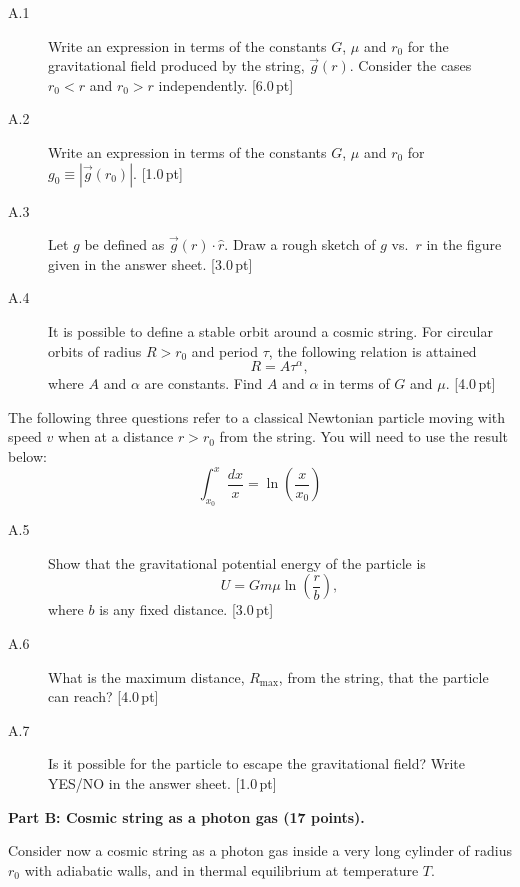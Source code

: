 \begin{description}
\item[A.1] Write an expression in terms of the constants $G$, $\mu$ and $r_0$
  for the gravitational field produced by the string, $\vec{g}(r)$. Consider
  the cases $r_0 < r$ and $r_0 > r$ independently. \hfill[6.0\,pt]
\item[A.2] Write an expression in terms of the constants $G$, $\mu$ and $r_0$
  for $g_0 \equiv |\vec{g}(r_0)|$. \hfill[1.0\,pt]
\item[A.3] Let $g$ be defined as $\vec{g}(r)\cdot\hat{r}$. Draw a rough sketch
  of $g$ vs.\ $r$ in the figure given in the answer sheet. \hfill[3.0\,pt]
\item[A.4] It is possible to define a stable orbit around a cosmic string. For
  circular orbits of radius $R > r_0$ and period $\tau$, the following
  relation is attained
  \[ R = A\tau^\alpha, \]
  where $A$ and $\alpha$ are constants. Find $A$ and $\alpha$ in terms of $G$
  and $\mu$. \hfill[4.0\,pt]
\end{description}

The following three questions refer to a classical Newtonian particle moving
with speed $v$ when at a distance $r > r_0$ from the string. You will need to
use the result below:
\[ \int_{x_0}^{x}\frac{dx}{x} = \ln\left(\frac{x}{x_0}\right) \]

\begin{description}
\item[A.5] Show that the gravitational potential energy of the particle is
  \[ U = Gm\mu\ln\left(\frac{r}{b}\right), \]
  where $b$ is any fixed distance. \hfill[3.0\,pt]
\item[A.6] What is the maximum distance, $R_{\max}$, from the string, that the
  particle can reach? \hfill[4.0\,pt]
\item[A.7] Is it possible for the particle to escape the gravitational field?
  Write YES/NO in the answer sheet. \hfill[1.0\,pt]
\end{description}

\medskip
\textbf{Part B: Cosmic string as a photon gas (17 points).}

Consider now a cosmic string as a photon gas inside a very long cylinder of
radius $r_0$ with adiabatic walls, and in thermal equilibrium at temperature
$T$.


